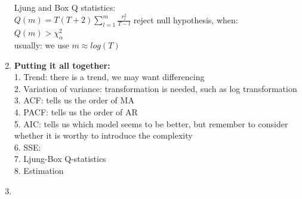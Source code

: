 \documentclass[10pt,landscape]{article}
\begin{document}
\begin{multicols}{3}
\begin{enumerate}
  		Ljung and Box Q statistics:\\
  		$
  		Q(m) = T(T+2)\sum_{l=1}^m \frac{r_l^2}{T-l}
  		$
  		reject null hypothesis, when:\\
  		$
  		Q(m)>\chi^2_\alpha
  		$\\
  		
  		usually: we use $m \approx log(T)$
  		
  		
  \item \textbf{Putting it all together:}\\
  		1. Trend: there is a trend, we may want differencing\\
  		2. Variation of variance: transformation is needed, such as log transformation\\
  		3. ACF: tells us the order of MA\\
  		4. PACF: tells us the order of AR\\
  		5. AIC: tells us which model seems to be better, but remember to consider whether it is worthy to introduce the complexity\\
  		6. SSE:\\
  		7. Ljung-Box Q-statistics\\
  		8. Estimation
  \item 
\end{enumerate}

\end{multicols}

\end{document}
